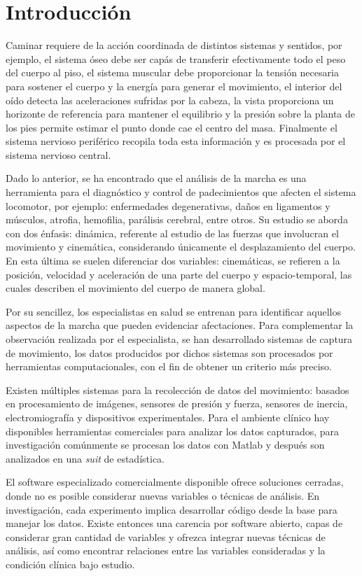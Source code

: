 \chapter{Introducción}

Caminar requiere de la acción coordinada de distintos sistemas y sentidos, por ejemplo, el sistema óseo debe ser capás de transferir efectivamente todo el peso del cuerpo al piso, el sistema muscular debe proporcionar la tensión necesaria para sostener el cuerpo y la energía para generar el movimiento, el interior del oído detecta las aceleraciones sufridas por la cabeza, la vista proporciona un horizonte de referencia para mantener el equilibrio y la presión sobre la planta de los pies permite estimar el punto donde cae el centro del masa. Finalmente el sistema nervioso periférico recopila toda esta información y es procesada por el sistema nervioso central. 

Dado lo anterior, se ha encontrado que el análisis de la marcha es una herramienta para el diagnóstico y control de padecimientos que afecten el sistema locomotor, por ejemplo: enfermedades degenerativas, daños en ligamentos y músculos, atrofia, hemofilia, parálisis cerebral, entre otros. Su estudio se aborda con dos énfasis: dinámica, referente al estudio de las fuerzas que involucran el movimiento y cinemática, considerando únicamente el desplazamiento del cuerpo. En esta última se suelen diferenciar dos variables: cinemáticas, se refieren a la posición, velocidad y aceleración de una parte del cuerpo y espacio-temporal, las cuales describen el movimiento del cuerpo de manera global. 

Por su sencillez, los especialistas en salud se entrenan para identificar aquellos aspectos de la marcha que pueden evidenciar afectaciones. Para complementar la observación realizada por el especialista, se han desarrollado sistemas de captura de movimiento, los datos producidos por dichos sistemas son procesados por herramientas computacionales, con el fin de obtener un criterio más preciso.

Existen múltiples sistemas para la recolección de datos del movimiento: basados en procesamiento de imágenes, sensores de presión y fuerza, sensores de inercia, electromiografía y dispositivos experimentales. Para el ambiente clínico hay disponibles herramientas comerciales para analizar los datos capturados, para investigación comúnmente se procesan los datos con Matlab y después son analizados en una \emph{suit} de estadística. 

El software especializado comercialmente disponible ofrece soluciones cerradas, donde no es posible considerar nuevas variables o técnicas de análisis. En investigación, cada experimento implica desarrollar código desde la base para manejar los datos. Existe entonces una carencia por software abierto, capas de considerar gran cantidad de variables y ofrezca integrar nuevas técnicas de análisis, así como encontrar relaciones entre las variables consideradas y la condición clínica bajo estudio.

